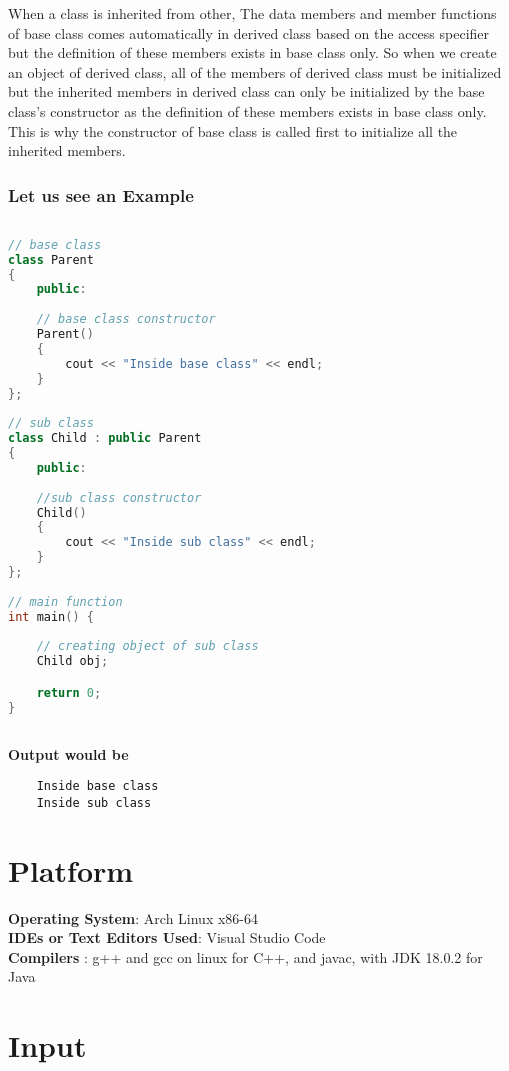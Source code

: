 \documentclass[11pt]{article}
\begin{document}
When a class is inherited from other, The data members and member functions of base class comes automatically in derived class based on the access specifier but the definition of these members exists in base class only. So when we create an object of derived class, all of the members of derived class must be initialized but the inherited members in derived class can only be initialized by the base class's constructor as the definition of these members exists in base class only. \\

This is why the constructor of base class is called first to initialize all the inherited members.

\subsubsection*{Let us see an Example}

\begin{lstlisting}[language = C++]
 
// base class
class Parent
{
    public:
     
    // base class constructor
    Parent()
    {
        cout << "Inside base class" << endl;
    }
};
 
// sub class
class Child : public Parent
{
    public:
     
    //sub class constructor
    Child()
    {
        cout << "Inside sub class" << endl;
    }
};
 
// main function
int main() {
      
    // creating object of sub class
    Child obj;

    return 0;
}
	
\end{lstlisting}
\textbf{Output would be}
\begin{verbatim}
	Inside base class
	Inside sub class
\end{verbatim}

\section{Platform}
\textbf{Operating System}: Arch Linux x86-64\\
\textbf{IDEs or Text Editors Used}: Visual Studio Code\\
\textbf{Compilers} : g++ and gcc on linux for C++, and javac, with JDK 18.0.2 for Java\\

\section{Input}
\end{document}
